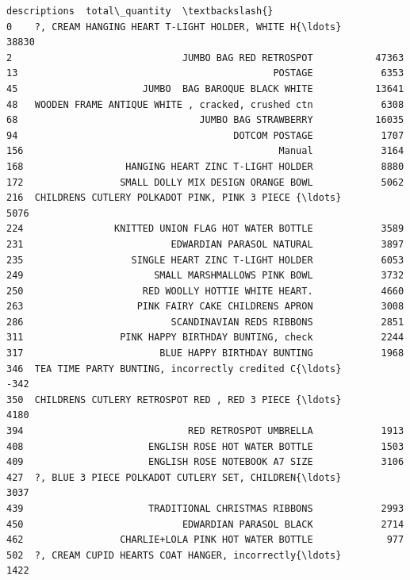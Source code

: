 \documentclass[11pt]{article}
\begin{document}
\begin{Verbatim}[commandchars=\\\{\}]
                                          descriptions  total\_quantity  \textbackslash{}
0    ?, CREAM HANGING HEART T-LIGHT HOLDER, WHITE H{\ldots}           38830   
2                              JUMBO BAG RED RETROSPOT           47363   
13                                             POSTAGE            6353   
45                      JUMBO  BAG BAROQUE BLACK WHITE           13641   
48   WOODEN FRAME ANTIQUE WHITE , cracked, crushed ctn            6308   
68                                JUMBO BAG STRAWBERRY           16035   
94                                      DOTCOM POSTAGE            1707   
156                                             Manual            3164   
168                  HANGING HEART ZINC T-LIGHT HOLDER            8880   
172                 SMALL DOLLY MIX DESIGN ORANGE BOWL            5062   
216  CHILDRENS CUTLERY POLKADOT PINK, PINK 3 PIECE {\ldots}            5076   
224                KNITTED UNION FLAG HOT WATER BOTTLE            3589   
231                          EDWARDIAN PARASOL NATURAL            3897   
235                   SINGLE HEART ZINC T-LIGHT HOLDER            6053   
249                       SMALL MARSHMALLOWS PINK BOWL            3732   
250                     RED WOOLLY HOTTIE WHITE HEART.            4660   
263                    PINK FAIRY CAKE CHILDRENS APRON            3008   
286                          SCANDINAVIAN REDS RIBBONS            2851   
311                 PINK HAPPY BIRTHDAY BUNTING, check            2244   
317                        BLUE HAPPY BIRTHDAY BUNTING            1968   
346  TEA TIME PARTY BUNTING, incorrectly credited C{\ldots}            -342   
350  CHILDRENS CUTLERY RETROSPOT RED , RED 3 PIECE {\ldots}            4180   
394                             RED RETROSPOT UMBRELLA            1913   
408                      ENGLISH ROSE HOT WATER BOTTLE            1503   
409                      ENGLISH ROSE NOTEBOOK A7 SIZE            3106   
427  ?, BLUE 3 PIECE POLKADOT CUTLERY SET, CHILDREN{\ldots}            3037   
439                      TRADITIONAL CHRISTMAS RIBBONS            2993   
450                            EDWARDIAN PARASOL BLACK            2714   
462                 CHARLIE+LOLA PINK HOT WATER BOTTLE             977   
502  ?, CREAM CUPID HEARTS COAT HANGER, incorrectly{\ldots}            1422   


\end{Verbatim}
\end{document}
